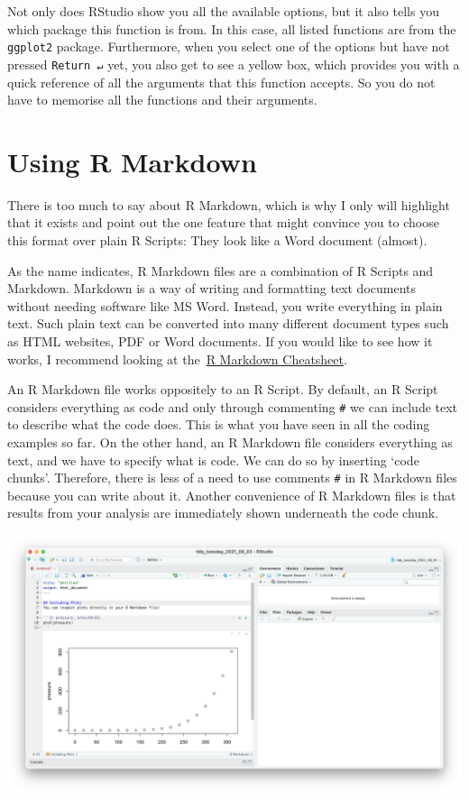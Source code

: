 \documentclass[
]{book}
\begin{document}
Not only does RStudio show you all the available options, but it also tells you which package this function is from. In this case, all listed functions are from the \texttt{ggplot2} package. Furthermore, when you select one of the options but have not pressed \texttt{Return\ ↵} yet, you also get to see a yellow box, which provides you with a quick reference of all the arguments that this function accepts. So you do not have to memorise all the functions and their arguments.

\hypertarget{r-markdown-and-r-notebooks}{%
\section{Using R Markdown}\label{r-markdown-and-r-notebooks}}

There is too much to say about R Markdown, which is why I only will highlight that it exists and point out the one feature that might convince you to choose this format over plain R Scripts: They look like a Word document (almost).

As the name indicates, R Markdown files are a combination of R Scripts and Markdown. Markdown is a way of writing and formatting text documents without needing software like MS Word. Instead, you write everything in plain text. Such plain text can be converted into many different document types such as HTML websites, PDF or Word documents. If you would like to see how it works, I recommend looking at the~\href{https://www.rstudio.com/resources/cheatsheets/}{R Markdown Cheatsheet}.

An R Markdown file works oppositely to an R Script. By default, an R Script considers everything as code and only through commenting \texttt{\#} we can include text to describe what the code does. This is what you have seen in all the coding examples so far. On the other hand, an R Markdown file considers everything as text, and we have to specify what is code. We can do so by inserting `code chunks'. Therefore, there is less of a need to use comments \texttt{\#} in R Markdown files because you can write about it. Another convenience of R Markdown files is that results from your analysis are immediately shown underneath the code chunk.

\includegraphics{images/chapter_06_img/03_r_markdown/01_r_markdown_plain.png}
\end{document}
